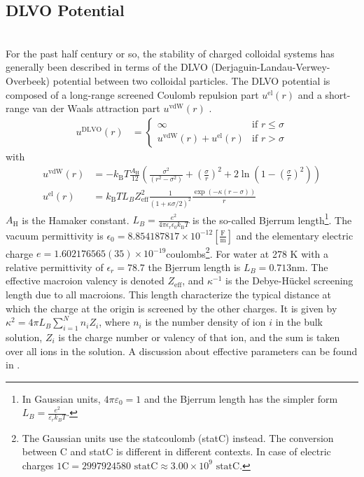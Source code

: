 \newpage
\subsection{DLVO Potential}
~\\

For the past half century or so, the stability of charged
colloidal systems has generally been described in terms of the
DLVO (Derjaguin-Landau-Verwey-Overbeek) potential between
two colloidal particles. The DLVO potential is composed
of a long-range screened Coulomb repulsion part $u^\text{el}(r)$
and a short-range van der Waals attraction part $u^\text{vdW}(r)$
\cite{Naegele1996}.
\begin{align}
u^\text{DLVO}(r) &=
\begin{cases}
\infty                          & \mbox{if } r \leq \sigma \\
u^\text{vdW}(r)+u^\text{el}(r)  & \mbox{if } r >    \sigma
\end{cases}
\end{align}
with
\begin{align}
u^\text{vdW}(r) &= -k_\text{B} T \frac{A_\text{H}}{12} \left(
                  \frac{\sigma^2}{\left(r^2-\sigma^2\right)}
                + \left(\frac{\sigma}{r}\right)^2
                + 2\ln\left(1-\left(\frac{\sigma}{r}\right)^2\right)
                \right) \\
u^\text{el}(r)  &= k_\text{B} T L_B Z_\text{eff}^2
                \frac{1}{\left(1+\kappa\sigma/2\right)^2}
                \frac{\exp\left(-\kappa (r-\sigma)\right)}{r}
\end{align}
$A_\text{H}$ is the Hamaker constant. $L_B=\frac{e^2}{4\pi \epsilon_r \epsilon_0 k_\text{B} T }$
is the so-called Bjerrum length\footnote{In Gaussian units, $4\pi\varepsilon_0 = 1$ and the Bjerrum
length has the simpler form $L_B = \frac{e^2}{\varepsilon_r k_B T}$.}. The vacuum permittivity is
$\epsilon_0= 8.854 187 817 \times 10^{-12} \left[\frac{\text{F}}{\text{m}}\right]$ and the elementary
electric charge $e=1.602176565(35)\times 10^{-19}$coulombs\footnote{The Gaussian units use
the statcoulomb (statC) instead. The conversion between C and statC is different in different contexts.
In case of electric charges $1\text{C} = 2997924580 \text{ statC} \approx 3.00\times 10^9 \text{ statC}$.}.
For water at 278 K with a relative permittivity of $\epsilon_r=78.7$ the Bjerrum length is $L_B=0.713$nm.
The effective macroion valency is denoted $Z_\text{eff}$, and $\kappa^{-1}$ is the Debye-H\"uckel screening length
due to all macroions. This length characterize the typical distance at which the charge at the origin is screened
by the other charges. It is given by $\kappa^{2}= 4\pi L_B \sum_{i=1}^N n_i Z_i$, where $n_i$ is the number density
of ion $i$ in the bulk solution, $Z_i$ is the charge number or valency of that ion, and the sum is taken over all ions in the solution. A discussion about effective parameters can be found in \cite{Alexander1984,Ulander2001}.


